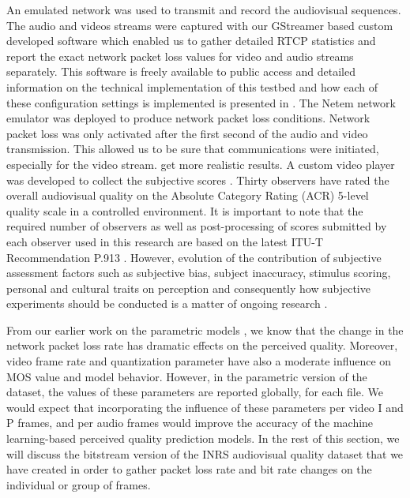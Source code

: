 \documentclass[journal]{IEEEtran}
\begin{document}
An emulated network was used to transmit and record the audiovisual sequences. The audio and videos streams were captured with our GStreamer based custom developed software which enabled us to gather detailed RTCP statistics and report the exact network packet loss values for video and audio streams separately. This software is freely available to public access \cite{demirbilek2016githubGStreamertestbed} and detailed information on the technical implementation of this testbed and how each of these configuration settings is implemented is presented in \cite{demirbilek2016multimedia}. The Netem network emulator was deployed to produce network packet loss conditions. Network packet loss was only activated after the first second of the audio and video transmission. This allowed us to be sure that communications were initiated, especially for the video stream. get more realistic results. A custom video player was developed to collect the subjective scores \cite{demirbilek2016githubplayer}. Thirty observers have rated the overall audiovisual quality on the Absolute Category Rating (ACR) 5-level quality scale in a controlled environment. It is important to note that the required number of observers as well as post-processing of scores submitted by each observer used in this research are based on the latest ITU-T Recommendation P.913 \cite{itu913subjective}. However, evolution of the contribution of subjective assessment factors such as subjective bias, subject inaccuracy, stimulus scoring, personal and cultural traits on perception and consequently how subjective experiments should be conducted is a matter of ongoing research \cite{janowski2015accuracy} \cite{scott2016personality}.

From our earlier work on the parametric models \cite{demirbilek2017parametricmodels}, we know that the change in the network packet loss rate has dramatic effects on the perceived quality. Moreover, video frame rate and quantization parameter have also a moderate influence on MOS value and model behavior. However, in the parametric version of the dataset, the values of these parameters are reported globally, for each file. We would expect that incorporating the influence of these parameters per video I and P frames, and per audio frames would improve the accuracy of the machine learning-based perceived quality prediction models. In the rest of this section, we will discuss the bitstream version of the INRS audiovisual quality dataset that we have created in order to gather packet loss rate and bit rate changes on the individual or group of frames. 
\end{document}
